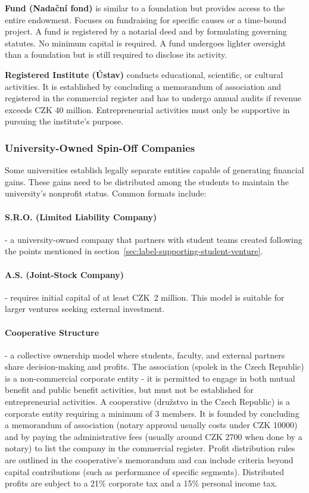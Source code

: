  \textbf{Fund (Nadační fond)} is similar to a foundation but provides access to the entire endowment. Focuses on fundraising for specific causes or a time-bound project. A fund is registered by a notarial deed and by formulating governing statutes. No minimum capital is required. A fund undergoes lighter oversight than a foundation but is still required to disclose its activity.

 \textbf{Registered Institute (Ústav)} conducts educational, scientific, or cultural activities. It is established by concluding a memorandum of association and registered in the commercial register and has to undergo annual audits if revenue exceeds CZK 40 million. Entrepreneurial activities must only be supportive in pursuing the institute’s purpose.

\subsubsection{University-Owned Spin-Off Companies}
Some universities establish legally separate entities capable of generating financial gains. These gains need to be distributed among the students to maintain the university’s nonprofit status. Common formats include:
\paragraph{S.R.O. (Limited Liability Company)} - a university-owned company that partners with student teams created following the points mentioned in section~\ref{sec:label-supporting-student-venture}.
\paragraph{A.S. (Joint-Stock Company)} - requires initial capital of at least CZK~2 million. This model is suitable for larger ventures seeking external investment.
\paragraph{Cooperative Structure} - a collective ownership model where students, faculty, and external partners share decision-making and profits. The association (spolek in the Czech Republic) is a non-commercial corporate entity - it is permitted to engage in both mutual benefit and public benefit activities, but must not be established for entrepreneurial activities.  A cooperative (družstvo in the Czech Republic) is a corporate entity requiring a minimum of 3 members. It is founded by concluding a memorandum of association (notary approval usually costs under CZK 10000) and by paying the administrative fees (usually around CZK 2700 when done by a notary) to list the company in the commercial register. Profit distribution rules are outlined in the cooperative’s memorandum and can include criteria beyond capital contributions (such as performance of specific segments). Distributed profits are subject to a 21\% corporate tax and a 15\% personal income tax.